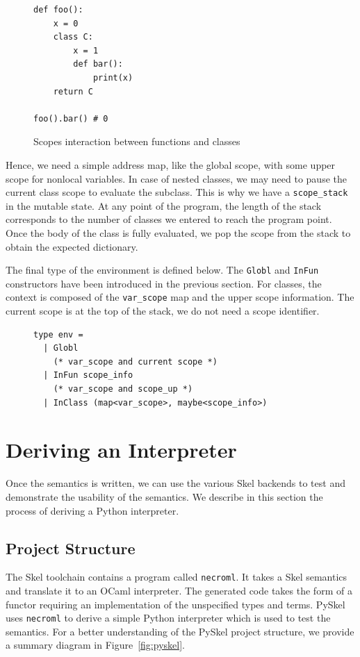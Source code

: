 \documentclass[submission,copyright,creativecommons]{eptcs}
\newcommand{\skinl}[1]{\texttt{#1}}
\begin{document}
\begin{figure}[ht]
  \centering
  \begin{minipage}{0.2\linewidth}
    \begin{verbatim}
def foo():
    x = 0
    class C:
        x = 1
        def bar():
            print(x)
    return C

foo().bar() # 0
    \end{verbatim}
  \end{minipage}
  \caption{\label{fig:classscope}Scopes interaction between functions and classes}
\end{figure}


Hence, we need a simple address map, like the global scope, with some upper scope for nonlocal variables.
In case of nested classes, we may need to pause the current class scope to evaluate the subclass.
This is why we have a \texttt{scope_stack} in the mutable state.
At any point of the program, the length of the stack corresponds to the number of classes we entered to reach the program point.
Once the body of the class is fully evaluated, we pop the scope from the stack to obtain the expected dictionary.

The final type of the environment is defined below.
The \skinl{Globl} and \skinl{InFun} constructors have been introduced in the previous section.
For classes, the context is composed of the \skinl{var_scope} map and the upper scope information.
The current scope is at the top of the stack, we do not need a scope identifier.
\begin{figure}[h]
  \centering
  \begin{minipage}{0.55\linewidth}
    \begin{verbatim}
type env =
  | Globl
    (* var_scope and current scope *)
  | InFun scope_info
    (* var_scope and scope_up *)
  | InClass (map<var_scope>, maybe<scope_info>)
    \end{verbatim}
  \end{minipage}
\end{figure}


\section{Deriving an Interpreter}\label{sec:interp}
Once the semantics is written, we can use the various Skel backends to test and demonstrate the usability of the semantics.
We describe in this section the process of deriving a Python interpreter.

\subsection{Project Structure}
The Skel toolchain contains a program called \texttt{necroml}.
It takes a Skel semantics and translate it to an OCaml interpreter.
The generated code takes the form of a functor requiring an implementation of
the unspecified types and terms.
PySkel uses \texttt{necroml} to derive a simple Python interpreter which is used to test the semantics.
For a better understanding of the PySkel project structure, we provide a summary
diagram in Figure~\vref{fig:pyskel}.
\end{document}
